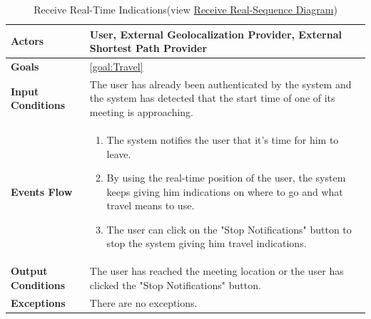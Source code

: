 \begin{table}[H]
	\centering
	\def\arraystretch{1.5}
	\begin{tabular}{|m{7cm}|m{7cm}|}
		\hline
		\textbf{Actors}            & User, External Geolocalization Provider, External Shortest Path Provider		    \\ \hline
		\textbf{Goals}             & \ref{goal:Travel}         \\ \hline
		\textbf{Input Conditions}  & The user has already been authenticated by the system and the system has detected that the start time of one of its meeting is approaching.           \\ \hline
		\textbf{Events Flow}       & 
			\begin{enumerate}[topsep=0pt, leftmargin=*]
				\item The system notifies the user that it's time for him to leave.
				\item By using the real-time position of the user, the system keeps giving him indications on where to go and what travel means to use.
				\item The user can click on the "Stop Notifications" button to stop the system giving him travel indications.
			\end{enumerate}	        \\ \hline
		\textbf{Output Conditions} & The user has reached the meeting location or the user has clicked the "Stop Notifications" button.           \\ \hline
		\textbf{Exceptions}        & There are no exceptions.           \\ \hline
	\end{tabular}
	\caption[Receive Real-Time Indications]{{Receive Real-Time Indications}\label{UseCaseDescr:RealTimeInd} (view \hyperref[SeqDiagr:RealTimeInd]{Receive Real-Sequence Diagram})}
\end{table}

